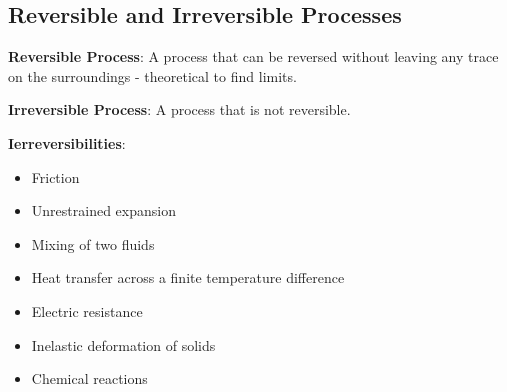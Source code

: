 \documentclass{article}
\begin{document}
\begin{multicols}{3}
    \subsection*{Reversible and Irreversible Processes}
    \textbf{Reversible Process}: A process that can be reversed without leaving any trace on the surroundings - theoretical to find limits.\par 
    \textbf{Irreversible Process}: A process that is not reversible.\par 
    \textbf{Ierreversibilities}:
    \begin{itemize}
        \item Friction
        \item Unrestrained expansion
        \item Mixing of two fluids
        \item Heat transfer across a finite temperature difference
        \item Electric resistance
        \item Inelastic deformation of solids
        \item Chemical reactions
    \end{itemize}

\end{multicols}
\end{document}
